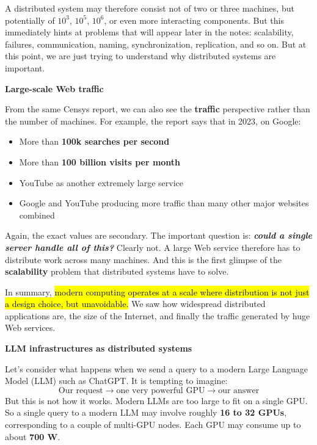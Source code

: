 \highspace
\textcolor{Red2}{} A distributed system may therefore consist not of two or three machines, but potentially of $10^{3}$, $10^{5}$, $10^{6}$, or even more interacting components. But this immediately hints at problems that will appear later in the notes: scalability, failures, communication, naming, synchronization, replication, and so on. But at this point, we are just trying to understand why distributed systems are important.

\highspace
\begin{flushleft}
    \textcolor{Red2}{ \textbf{Large-scale Web traffic}}
\end{flushleft}
From the same Censys report, we can also see the \textbf{traffic} perspective rather than the number of machines. For example, the report says that in 2023, on Google:
\begin{itemize}
    \item More than \textbf{100k searches per second}
    \item More than \textbf{100 billion visits per month}
    \item YouTube as another extremely large service
    \item Google and YouTube producing more traffic than many other major websites combined
\end{itemize}
Again, the exact values are secondary. The important question is: \emph{\textbf{could a single server handle all of this?}} Clearly not. A large Web service therefore has to distribute work across many machines. And this is the first glimpse of the \textbf{scalability} problem that distributed systems have to solve.

\highspace
In summary, \hl{modern computing operates at a scale where distribution is not just a design choice, but unavoidable.} We saw how widespread distributed applications are, the size of the Internet, and finally the traffic generated by huge Web services.

\highspace
\begin{flushleft}
    \textcolor{Green3}{ \textbf{LLM infrastructures as distributed systems}}
\end{flushleft}
Let's consider what happens when we send a query to a modern Large Language Model (LLM) such as ChatGPT. It is tempting to imagine:
\begin{equation*}
    \text{Our request} \to \text{one very powerful GPU} \to \text{our answer}
\end{equation*}
But this is not how it works. Modern LLMs are too large to fit on a single GPU. So a single query to a modern LLM may involve roughly \textbf{16 to 32 GPUs}, corresponding to a couple of multi-GPU nodes. Each GPU may consume up to about \textbf{700 W}.

